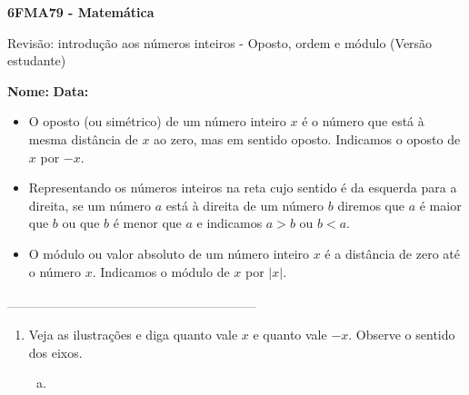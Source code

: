 \documentclass[a4paper,14pt]{article}
\begin{document}
	
	\noindent\textbf{6FMA79 - Matemática} 
	
	\begin{center}Revisão: introdução aos números inteiros - Oposto, ordem e módulo (Versão estudante)
	\end{center}
	
	\noindent\textbf{Nome:} \underline{\hspace{10cm}}
	\noindent\textbf{Data:} \underline{\hspace{4cm}}
	
	
	\begin{multicols}{2}
		\noindent
		\begin{itemize}
			\item O oposto (ou simétrico) de um número inteiro $x$ é o número que está à mesma distância de $x$ ao zero, mas em sentido oposto. Indicamos o oposto de $x$ por $-x$.
			\item Representando os números inteiros na reta cujo sentido é da esquerda para a direita, se um número $a$ está à direita de um número $b$ diremos que $a$ é maior que $b$ ou que $b$ é menor que $a$ e indicamos $a > b$ ou $b < a$.
			\item O módulo ou valor absoluto de um número inteiro $x$ é a distância de zero até o número $x$. Indicamos o módulo de $x$ por $|x|$.
		\end{itemize}
		\noindent\textsubscript{-----------------------------------------------------------------------}
    	\begin{enumerate}
   			\item Veja as ilustrações e diga quanto vale $x$ e quanto vale $-x$. Observe o sentido dos eixos.
			\begin{enumerate}[a)]
				\item ~\\ 
\end{enumerate}
\end{enumerate}
\end{multicols}
\end{document}
